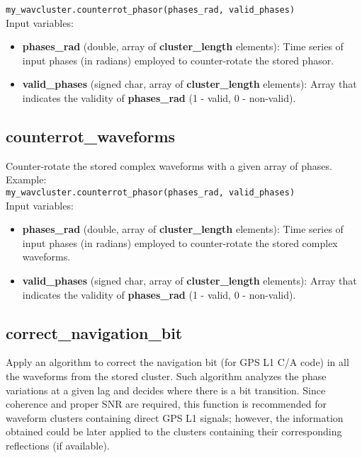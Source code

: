 \texttt{my\_wavcluster.counterrot\_phasor(phases\_rad, valid\_phases)}\\

Input variables:
\begin{itemize}
\item {\bf phases\_rad} (double, array of {\bf cluster\_length} elements): Time series of input phases (in radians) employed to counter-rotate the stored phasor.
\item {\bf valid\_phases} (signed char, array of {\bf cluster\_length} elements): Array that indicates the validity of {\bf phases\_rad} (1 - valid, 0 - non-valid).
\end{itemize}


\subsection{counterrot\_waveforms}

Counter-rotate the stored complex waveforms with a given array of phases.\\

Example:\\

\texttt{my\_wavcluster.counterrot\_phasor(phases\_rad, valid\_phases)}\\

Input variables:
\begin{itemize}
\item {\bf phases\_rad} (double, array of {\bf cluster\_length} elements): Time series of input phases (in radians) employed to counter-rotate the stored complex waveforms.
\item {\bf valid\_phases} (signed char, array of {\bf cluster\_length} elements): Array that indicates the validity of {\bf phases\_rad} (1 - valid, 0 - non-valid).
\end{itemize}


\subsection{correct\_navigation\_bit}

Apply an algorithm to correct the navigation bit (for GPS L1 C/A code) in all the waveforms from the stored cluster. Such algorithm analyzes the phase variations at a given lag and decides where there is a bit transition. Since coherence and proper SNR are required, this function is recommended for waveform clusters containing direct GPS L1 signals; however, the information obtained could be later applied to the clusters containing their corresponding reflections (if available).\\

